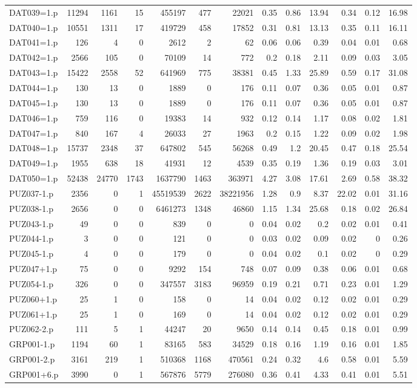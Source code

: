 \begin{table}[H]
\begin{adjustwidth}{-1.1in}{-0.5in}
\begin{tabular}{| l || r | r | r || r | r | r || r | r | r | r | r | r |}
DAT039=1.p&11294&1161&15&455197&477&22021&0.35&0.86&13.94&0.34&0.12&16.98\\
DAT040=1.p&10551&1311&17&419729&458&17852&0.31&0.81&13.13&0.35&0.11&16.11\\
DAT041=1.p&126&4&0&2612&2&62&0.06&0.06&0.39&0.04&0.01&0.68\\
DAT042=1.p&2566&105&0&70109&14&772&0.2&0.18&2.11&0.09&0.03&3.05\\
DAT043=1.p&15422&2558&52&641969&775&38381&0.45&1.33&25.89&0.59&0.17&31.08\\
DAT044=1.p&130&13&0&1889&0&176&0.11&0.07&0.36&0.05&0.01&0.87\\
DAT045=1.p&130&13&0&1889&0&176&0.11&0.07&0.36&0.05&0.01&0.87\\
DAT046=1.p&759&116&0&19383&14&932&0.12&0.14&1.17&0.08&0.02&1.81\\
DAT047=1.p&840&167&4&26033&27&1963&0.2&0.15&1.22&0.09&0.02&1.98\\
DAT048=1.p&15737&2348&37&647802&545&56268&0.49&1.2&20.45&0.47&0.18&25.54\\
DAT049=1.p&1955&638&18&41931&12&4539&0.35&0.19&1.36&0.19&0.03&3.01\\
DAT050=1.p&52438&24770&1743&1637790&1463&363971&4.27&3.08&17.61&2.69&0.58&38.32\\
PUZ037-1.p&2356&0&1&45519539&2622&38221956&1.28&0.9&8.37&22.02&0.01&31.16\\
PUZ038-1.p&2656&0&0&6461273&1348&46860&1.15&1.34&25.68&0.18&0.02&26.84\\
PUZ043-1.p&49&0&0&839&0&0&0.04&0.02&0.2&0.02&0.01&0.41\\
PUZ044-1.p&3&0&0&121&0&0&0.03&0.02&0.09&0.02&0&0.26\\
PUZ045-1.p&4&0&0&179&0&0&0.04&0.02&0.1&0.02&0&0.29\\
PUZ047+1.p&75&0&0&9292&154&748&0.07&0.09&0.38&0.06&0.01&0.68\\
PUZ054-1.p&326&0&0&347557&3183&96959&0.19&0.21&0.71&0.23&0.01&1.29\\
PUZ060+1.p&25&1&0&158&0&14&0.04&0.02&0.12&0.02&0.01&0.29\\
PUZ061+1.p&25&1&0&169&0&14&0.04&0.02&0.12&0.02&0.01&0.29\\
PUZ062-2.p&111&5&1&44247&20&9650&0.14&0.14&0.45&0.18&0.01&0.99\\
GRP001-1.p&1194&60&1&83165&583&34529&0.18&0.16&1.19&0.16&0.01&1.85\\
GRP001-2.p&3161&219&1&510368&1168&470561&0.24&0.32&4.6&0.58&0.01&5.59\\
GRP001+6.p&3990&0&1&567876&5779&276080&0.36&0.41&4.33&0.41&0.01&5.51\\

\end{tabular}
\end{adjustwidth}
\end{table}
